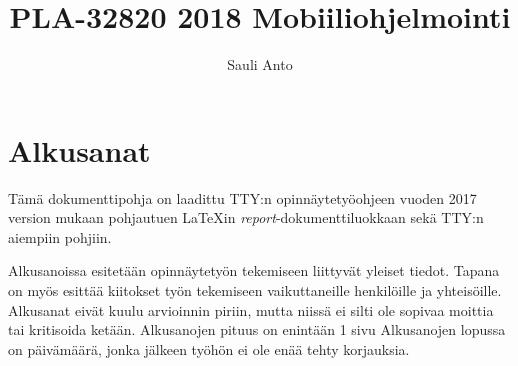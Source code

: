 \documentclass[globalnumbering,centeredcaptions]{tutthesis/tutthesis} %
\author{Sauli Anto}
\title{PLA-32820 2018 Mobiiliohjelmointi}
\begin{document}
\maketitle


\iffalse
\thesisdescription{Oppimispäiväkirja}
\begin{abstract}
Tiivistelmä on suppea, 1 sivun mittainen itsenäinen esitys työstä: mikä oli ongelma, mitä tehtiin ja mitä saatiin tulokseksi.
Kuvia, kaavioita ja taulukoita ei käytetä tiivistelmässä.

Laita työn pääkielellä kirjoitettu tiivistelmä ensin ja käännös sen jälkeen.
Suomenkieliselle kandidaatintyölle pitää olla myös englanninkielinen nimi arkistointia varten.
\end{abstract}
\fi
\iffalse
\begin{otherlanguage}{english}

\title{Tampere University of Technology thesis template}
\programme{...}
\thesisdescription{...}

\begin{abstract}
The abstract is a self-contained, concise description of the thesis: what was the problem, what was done, what was the result.
Do not include charts or tables in the abstract.

First include the abstract written in the main language of the thesis and then the translation.
A bachelor's thesis in Finnish must also have a name in English for archival.
\end{abstract}
\end{otherlanguage}
\fi

\iffalse
\chapter*{Alkusanat}

Tämä dokumenttipohja on laadittu TTY:n opinnäytetyöohjeen vuoden 2017 version mukaan pohjautuen LaTeXin \emph{report}-dokumenttiluokkaan sekä TTY:n aiempiin pohjiin.

Alkusanoissa esitetään opinnäytetyön tekemiseen liittyvät yleiset tiedot.
Tapana on myös esittää kiitokset työn tekemiseen vaikuttaneille henkilöille ja yhteisöille.
Alkusanat eivät kuulu arvioinnin piriin, mutta niissä ei silti ole sopivaa moittia tai kritisoida ketään.
Alkusanojen pituus on enintään 1 sivu
Alkusanojen lopussa on päivämäärä, jonka jälkeen työhön ei ole enää tehty korjauksia.
\end{document}
